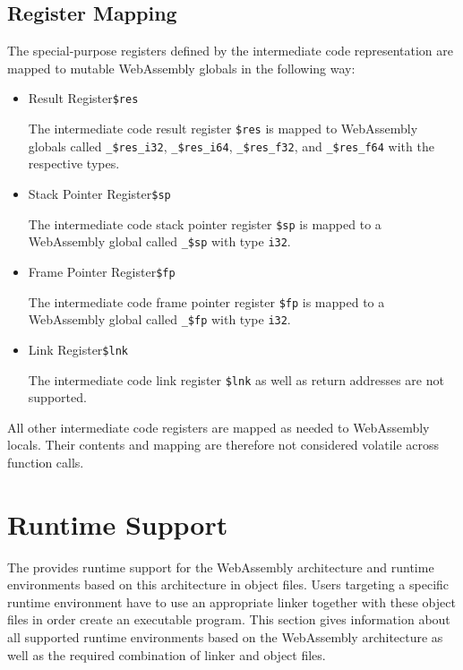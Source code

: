 \subsection{Register Mapping}

The special-purpose registers defined by the intermediate code representation are mapped to mutable WebAssembly globals in the following way:

\begin{itemize}

\item Result Register\alignright\texttt{\$res}\nopagebreak

The intermediate code result register \texttt{\$res} is mapped to WebAssembly globals called \texttt{_\$res_i32}, \texttt{_\$res_i64}, \texttt{_\$res_f32}, and \texttt{_\$res_f64} with the respective types.

\item Stack Pointer Register\alignright\texttt{\$sp}\nopagebreak

The intermediate code stack pointer register \texttt{\$sp} is mapped to a WebAssembly global called \texttt{_\$sp} with type \texttt{i32}.

\item Frame Pointer Register\alignright\texttt{\$fp}\nopagebreak

The intermediate code frame pointer register \texttt{\$fp} is mapped to a WebAssembly global called \texttt{_\$fp} with type \texttt{i32}.

\item Link Register\alignright\texttt{\$lnk}\nopagebreak

The intermediate code link register \texttt{\$lnk} as well as return addresses are not supported.

\end{itemize}

All other intermediate code registers are mapped as needed to WebAssembly locals.
Their contents and mapping are therefore not considered volatile across function calls.

\section{Runtime Support}

The \ecs{} provides runtime support for the WebAssembly architecture and runtime environments based on this architecture in object files.
Users targeting a specific runtime environment have to use an appropriate linker together with these object files in order create an executable program.
This section gives information about all supported runtime environments based on the WebAssembly architecture as well as the required combination of linker and object files.

